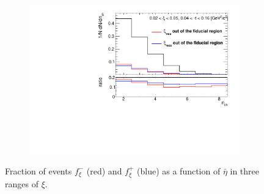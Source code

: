 \begin{figure}[h!]
\begin{subfigure}{.49\textwidth}
	\end{subfigure}
	\begin{subfigure}{.49\textwidth}
		\includegraphics[width=\textwidth,page=9]{chapters/chrgSTAR/img/xiMigration/xi.pdf}
	\end{subfigure}
	\begin{minipage}{.49\textwidth}
		\caption[Fraction of events $f_{\xi}^-$ and $f_{\xi}^+$ as a function of $\bar{\eta}$ in three ranges of $\xi$]{Fraction of events $f_{\xi}^-$ (red) and $f_{\xi}^+$ (blue) as a function of $\bar{\eta}$ in three ranges of $\xi$.}
		\label{fig:xi_correction_eta}
	\end{minipage}
	
\end{figure}
\captionsetup{format=default,indention=0pt,justification=justified}
\FloatBarrier
